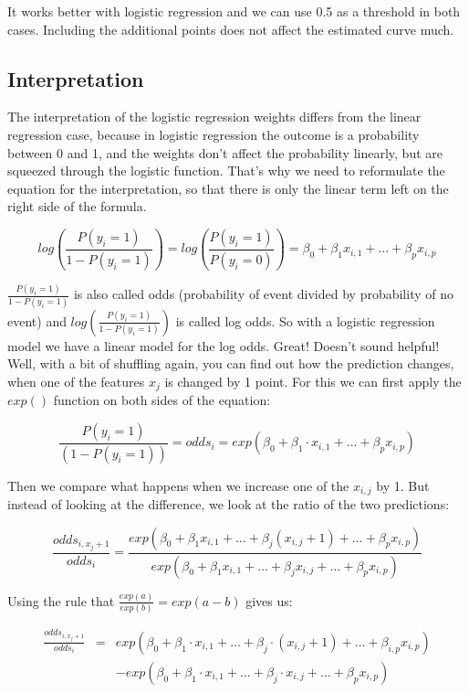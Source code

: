 \documentclass[12pt,]{krantz}
\theoremstyle{definition}
\theoremstyle{definition}
\theoremstyle{definition}
\theoremstyle{remark}
\begin{document}
It works better with logistic regression and we can use 0.5 as a
threshold in both cases. Including the additional points does not affect
the estimated curve much.

\subsection{Interpretation}\label{interpretation-1}

The interpretation of the logistic regression weights differs from the
linear regression case, because in logistic regression the outcome is a
probability between 0 and 1, and the weights don't affect the
probability linearly, but are squeezed through the logistic function.
That's why we need to reformulate the equation for the interpretation,
so that there is only the linear term left on the right side of the
formula.

\[log\left(\frac{P(y_{i}=1)}{1 - P(y_{i}=1)}\right) =  log\left(\frac{P(y_{i}=1)}{ P(y_{i}=0)}\right) = \beta_{0} + \beta_{1} x_{i,1} + \ldots + \beta_{p} x_{i,p}\]

\(\frac{P(y_{i}=1)}{1 - P(y_{i}=1)}\) is also called odds (probability
of event divided by probability of no event) and
\(log\left(\frac{P(y_{i}=1)}{1 - P(y_{i}=1)}\right)\) is called log
odds. So with a logistic regression model we have a linear model for the
log odds. Great! Doesn't sound helpful! Well, with a bit of shuffling
again, you can find out how the prediction changes, when one of the
features \(x_j\) is changed by 1 point. For this we can first apply the
\(exp()\) function on both sides of the equation:

\[\frac{P(y_{i}=1)}{(1 - P(y_{i}=1))} = odds_i =  exp\left(\beta_{0} + \beta_{1} \cdot x_{i,1} + \ldots + \beta_{p} x_{i,p}\right)\]

Then we compare what happens when we increase one of the \(x_{i,j}\) by
1. But instead of looking at the difference, we look at the ratio of the
two predictions:

\[ \frac{odds_{i, x_j + 1}}{odds_i}= \frac{exp\left(\beta_{0} + \beta_{1} x_{i,1} + \ldots + \beta_{j} (x_{i,j} + 1)  + \ldots+ \beta_{p} x_{i,p}\right)}{exp\left(\beta_{0} + \beta_{1} x_{i,1} + \ldots + \beta_{j} x_{i,j}  + \ldots+ \beta_{p} x_{i,p}\right)}\]

Using the rule that \(\frac{exp(a)}{exp(b)} = exp(a - b)\) gives us:

\[
\begin{aligned}
  \frac{odds_{i, x_j + 1}}{odds_i} &  = & exp\left(\beta_{0} + \beta_{1} \cdot x_{i,1} + \ldots + \beta_{j} \cdot (x_{i,j} + 1)  + \ldots+ \beta_{i,p}x_{i,p}\right) \\
    & & - exp\left(\beta_{0} + \beta_{1} \cdot x_{i,1} + \ldots + \beta_{j} \cdot x_{i,j}  + \ldots+ \beta_{p} x_{i,p}\right)
\end{aligned}
\]
\end{document}
